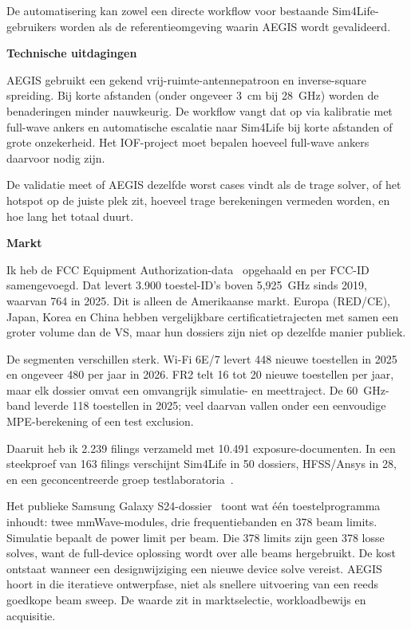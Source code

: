 \documentclass[10pt,a4paper]{article}
\begin{document}
De automatisering kan zowel een directe workflow voor bestaande Sim4Life-gebruikers worden als de referentieomgeving waarin AEGIS wordt gevalideerd.

\textbf{Technische uitdagingen}

AEGIS gebruikt een gekend vrij-ruimte-antennepatroon en inverse-square spreiding. Bij korte afstanden (onder ongeveer 3~cm bij 28~GHz) worden de benaderingen minder nauwkeurig. De workflow vangt dat op via kalibratie met full-wave ankers en automatische escalatie naar Sim4Life bij korte afstanden of grote onzekerheid. Het IOF-project moet bepalen hoeveel full-wave ankers daarvoor nodig zijn.

De validatie meet of AEGIS dezelfde worst cases vindt als de trage solver, of het hotspot op de juiste plek zit, hoeveel trage berekeningen vermeden worden, en hoe lang het totaal duurt.

\textbf{Markt}

Ik heb de FCC Equipment Authorization-data~\cite{fcc_eas} opgehaald en per FCC-ID samengevoegd. Dat levert 3.900 toestel-ID's boven 5,925~GHz sinds 2019, waarvan 764 in 2025. Dit is alleen de Amerikaanse markt. Europa (RED/CE), Japan, Korea en China hebben vergelijkbare certificatietrajecten met samen een groter volume dan de VS, maar hun dossiers zijn niet op dezelfde manier publiek.

De segmenten verschillen sterk. Wi-Fi 6E/7 levert 448 nieuwe toestellen in 2025 en ongeveer 480 per jaar in 2026. FR2 telt 16 tot 20 nieuwe toestellen per jaar, maar elk dossier omvat een omvangrijk simulatie- en meettraject. De 60~GHz-band leverde 118 toestellen in 2025; veel daarvan vallen onder een eenvoudige MPE-berekening of een test exclusion.

Daaruit heb ik 2.239 filings verzameld met 10.491 exposure-documenten. In een steekproef van 163 filings verschijnt Sim4Life in 50 dossiers, HFSS/Ansys in 28, en een geconcentreerde groep testlaboratoria~\cite{ctia_labs}.

Het publieke Samsung Galaxy S24-dossier~\cite{samsung_s24_part0,samsung_s24_final} toont wat één toestelprogramma inhoudt: twee mmWave-modules, drie frequentiebanden en 378 beam limits. Simulatie bepaalt de power limit per beam. Die 378 limits zijn geen 378 losse solves, want de full-device oplossing wordt over alle beams hergebruikt. De kost ontstaat wanneer een designwijziging een nieuwe device solve vereist. AEGIS hoort in die iteratieve ontwerpfase, niet als snellere uitvoering van een reeds goedkope beam sweep. De waarde zit in marktselectie, workloadbewijs en acquisitie.
\end{document}
